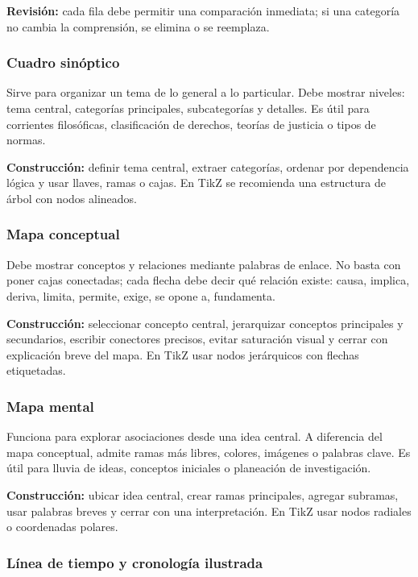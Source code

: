 \textbf{Revisión:} cada fila debe permitir una comparación inmediata; si una categoría no cambia la comprensión, se elimina o se reemplaza.

\subsubsection*{Cuadro sinóptico}

Sirve para organizar un tema de lo general a lo particular. Debe mostrar niveles: tema central, categorías principales, subcategorías y detalles. Es útil para corrientes filosóficas, clasificación de derechos, teorías de justicia o tipos de normas.

\textbf{Construcción:} definir tema central, extraer categorías, ordenar por dependencia lógica y usar llaves, ramas o cajas. En TikZ se recomienda una estructura de árbol con nodos alineados.

\subsubsection*{Mapa conceptual}

Debe mostrar conceptos y relaciones mediante palabras de enlace. No basta con poner cajas conectadas; cada flecha debe decir qué relación existe: causa, implica, deriva, limita, permite, exige, se opone a, fundamenta.

\textbf{Construcción:} seleccionar concepto central, jerarquizar conceptos principales y secundarios, escribir conectores precisos, evitar saturación visual y cerrar con explicación breve del mapa. En TikZ usar nodos jerárquicos con flechas etiquetadas.

\subsubsection*{Mapa mental}

Funciona para explorar asociaciones desde una idea central. A diferencia del mapa conceptual, admite ramas más libres, colores, imágenes o palabras clave. Es útil para lluvia de ideas, conceptos iniciales o planeación de investigación.

\textbf{Construcción:} ubicar idea central, crear ramas principales, agregar subramas, usar palabras breves y cerrar con una interpretación. En TikZ usar nodos radiales o coordenadas polares.

\subsubsection*{Línea de tiempo y cronología ilustrada}


